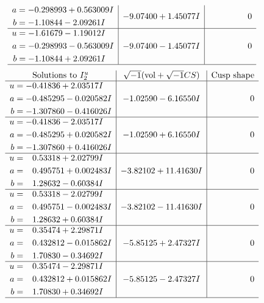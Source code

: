 \documentclass[1p]{elsarticle_modified}
\theoremstyle{definition}
\newcommand{\I}{\sqrt{-1}}
\begin{document}
$$\begin{array}{c|c|c}
\begin{aligned}
a &= -0.298993 + 0.563009 I \\
b &= -1.10844 - 2.09261 I\end{aligned}
 & -9.07400 + 1.45077 I & \phantom{-0.000000 } 0 \\ \hline\begin{aligned}
u &= -1.61679 - 1.19012 I \\
a &= -0.298993 - 0.563009 I \\
b &= -1.10844 + 2.09261 I\end{aligned}
 & -9.07400 - 1.45077 I & \phantom{-0.000000 } 0\\
 \hline 
 \end{array}$$\newpage$$\begin{array}{c|c|c}  
\text{Solutions to }I^u_{2}& \I (\text{vol} + \sqrt{-1}CS) & \text{Cusp shape}\\
 \hline 
\begin{aligned}
u &= -0.41836 + 2.03517 I \\
a &= -0.485295 - 0.020582 I \\
b &= -1.307860 - 0.416026 I\end{aligned}
 & -1.02590 - 6.16550 I & \phantom{-0.000000 } 0 \\ \hline\begin{aligned}
u &= -0.41836 - 2.03517 I \\
a &= -0.485295 + 0.020582 I \\
b &= -1.307860 + 0.416026 I\end{aligned}
 & -1.02590 + 6.16550 I & \phantom{-0.000000 } 0 \\ \hline\begin{aligned}
u &= \phantom{-}0.53318 + 2.02799 I \\
a &= \phantom{-}0.495751 + 0.002483 I \\
b &= \phantom{-}1.28632 - 0.60384 I\end{aligned}
 & -3.82102 + 11.41630 I & \phantom{-0.000000 } 0 \\ \hline\begin{aligned}
u &= \phantom{-}0.53318 - 2.02799 I \\
a &= \phantom{-}0.495751 - 0.002483 I \\
b &= \phantom{-}1.28632 + 0.60384 I\end{aligned}
 & -3.82102 - 11.41630 I & \phantom{-0.000000 } 0 \\ \hline\begin{aligned}
u &= \phantom{-}0.35474 + 2.29871 I \\
a &= \phantom{-}0.432812 - 0.015862 I \\
b &= \phantom{-}1.70830 - 0.34692 I\end{aligned}
 & -5.85125 + 2.47327 I & \phantom{-0.000000 } 0 \\ \hline\begin{aligned}
u &= \phantom{-}0.35474 - 2.29871 I \\
a &= \phantom{-}0.432812 + 0.015862 I \\
b &= \phantom{-}1.70830 + 0.34692 I\end{aligned}
 & -5.85125 - 2.47327 I & \phantom{-0.000000 } 0\\
 \hline 
 \end{array}$$\newpage\newpage\renewcommand{\arraystretch}{1}
\end{document}
